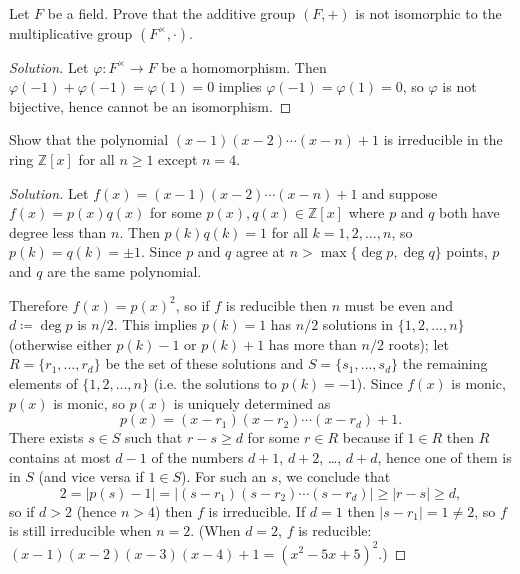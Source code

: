 \documentclass[10pt]{article}
\providecommand{\ZZ}{\mathbb Z}
\newenvironment{soln}{\begin{proof}[Solution]}{\end{proof}}
\providecommand{\abs}[1]{\left|#1\right|}
\begin{document}
\begin{problem}
    Let $F$ be a field. Prove that the additive group $(F,+)$
    is not isomorphic to the multiplicative group $(F^\times,\cdot)$.
\end{problem}

\begin{soln}
    Let $\varphi\colon F^\times\to F$ be a homomorphism.
    Then $\varphi(-1) + \varphi(-1) = \varphi(1) = 0$
    implies $\varphi(-1) = \varphi(1) = 0$,
    so $\varphi$ is not bijective, hence cannot be an isomorphism.
\end{soln}

\begin{problem}
    Show that the polynomial $(x-1)(x-2)\cdots(x-n)+1$
    is irreducible in the ring $\ZZ[x]$ for all $n\ge 1$ except $n=4$.
\end{problem}

\begin{soln}
    Let $f(x) = (x-1)(x-2)\cdots(x-n)+1$ and
    suppose $f(x) = p(x)q(x)$ for some $p(x),q(x)\in\ZZ[x]$
    where $p$ and $q$ both have degree less than $n$.
    Then $p(k)q(k) = 1$ for all $k=1,2,\dots,n$, so
    $p(k) = q(k) = \pm 1$. Since $p$ and $q$ agree
    at $n > \max\{\deg p,\deg q\}$ points, $p$ and $q$ are the same polynomial.

    Therefore $f(x) = p(x)^2$, so if $f$ is reducible
    then $n$ must be even and $d \coloneq \deg p$ is $n/2$.
    This implies $p(k) = 1$ has $n/2$ solutions in $\{1,2,\dots,n\}$
    (otherwise either $p(k) - 1$ or $p(k) + 1$ has more than $n/2$ roots);
    let $R = \{r_1,\dots,r_d\}$ be the set of these solutions
    and $S = \{s_1,\dots,s_d\}$ the remaining elements of $\{1,2,\dots,n\}$
    (i.e. the solutions to $p(k) = -1$).
    Since $f(x)$ is monic, $p(x)$ is monic, so $p(x)$ is uniquely determined as
    \begin{equation*}
        p(x) = (x - r_1)(x - r_2)\cdots(x - r_d) + 1.
    \end{equation*}
    There exists $s\in S$ such that $r - s \ge d$ for some $r\in R$
    because if $1\in R$ then $R$ contains at most $d-1$ of the
    numbers $d+1$, $d+2$, \dots, $d+d$, hence one of them is in $S$
    (and vice versa if $1\in S$). For such an $s$, we conclude that
    \begin{equation*}
	2 = \abs{p(s) - 1} = \abs{(s - r_1)(s - r_2)\cdots(s - r_d)}
	\ge \abs{r-s} \ge d,
    \end{equation*}
    so if $d > 2$ (hence $n > 4$) then $f$ is irreducible.
    If $d = 1$ then $\abs{s - r_1} = 1 \ne 2$,
    so $f$ is still irreducible when $n=2$.
    (When $d = 2$, $f$ is reducible: $(x-1)(x-2)(x-3)(x-4) + 1
    =(x^2 - 5x + 5)^2$.)
\end{soln}
\end{document}
